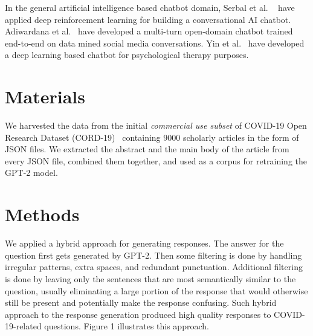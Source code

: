 \documentclass[sigconf,natbib=false]{acmart}
\begin{document}
\noindent In the general artificial intelligence based chatbot domain, Serbal et al.
~\cite{reinforce-chatbot} have applied deep reinforcement learning for building a
conversational AI chatbot. Adiwardana et al.~\cite{toward-human-chatbot} have developed
a multi-turn open-domain chatbot trained end-to-end on data mined social media conversations.
Yin et al.~\cite{therapy-chatbot} have developed a deep learning based chatbot for
psychological therapy purposes.


\section{Materials}


We harvested the data from the initial \textit{commercial use subset} of
COVID-19 Open Research Dataset (CORD-19)~\cite{cord19} containing 9000
scholarly articles in the form of JSON files. We extracted the abstract and the
main body of the article from every JSON file, combined them together, and used
as a corpus for retraining the GPT-2 model.


\section{Methods}

We applied a hybrid approach for generating responses. The answer for the
question first gets generated by GPT-2. Then some filtering is done by handling
irregular patterns, extra spaces, and redundant punctuation. Additional
filtering is done by leaving only the sentences that are most semantically
similar to the question, usually eliminating a large portion of the response
that would otherwise still be present and potentially make the response
confusing. Such hybrid approach to the response generation produced high
quality responses to COVID-19-related questions. Figure 1 illustrates this
approach.
\end{document}
